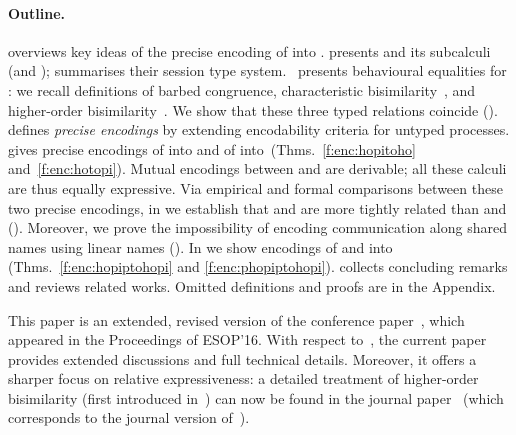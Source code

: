 \documentclass[runningheads]{llncs}
\begin{document}
{\paragraph{Outline.} 
 overviews key ideas of the precise encoding of \HOp into \sessp.
{} presents \HOp and its 
subcalculi (\HO and \sessp); %
 summarises their session type system.
~pres\-ents  behavioural equalities for \HOp:
we recall definitions of barbed congruence, 
characteristic bisimilarity~\cite{characteristic_bis}, 
and higher-order bisimilarity~\cite{KouzapasPY17}.
We show that these three typed relations coincide ().
 defines \emph{precise %
encodings} by extending encodability criteria  for untyped processes. %
{} %
gives {precise encodings} of \HOp into \HO and of \HOp into~\sessp (Thms.~\ref{f:enc:hopitoho} and~\ref{f:enc:hotopi}).
Mutual encodings between \sessp and \HO are derivable; 
all these calculi are thus equally expressive.
Via
empirical and formal comparisons between these two precise encodings, in  we establish that
\HOp and \HO are more tightly related than \HOp and \sessp ().
Moreover, we prove the impossibility of encoding communication along shared names
using linear names ().
In  %
we show 
encodings of \HOpp and \PHOp 
into \HOp
(Thms.~\ref{f:enc:hopiptohopi} and \ref{f:enc:phopiptohopi}).
{} collects concluding remarks and reviews related works.
{Omitted definitions and  proofs are in the Appendix.
} 

This paper is an extended, revised version of the conference paper~\cite{DBLP:conf/esop/KouzapasPY16}, which appeared in the Proceedings of ESOP'16.
With respect to~\cite{DBLP:conf/esop/KouzapasPY16}, the current paper 
provides extended discussions and full technical details. Moreover, it 
offers a sharper focus on relative expressiveness:
a detailed treatment of higher-order bisimilarity
(first introduced in~\cite{DBLP:conf/esop/KouzapasPY16}) can now be found in the journal paper~\cite{KouzapasPY17} (which corresponds to the journal version of~\cite{characteristic_bis}).

}
\end{document}
